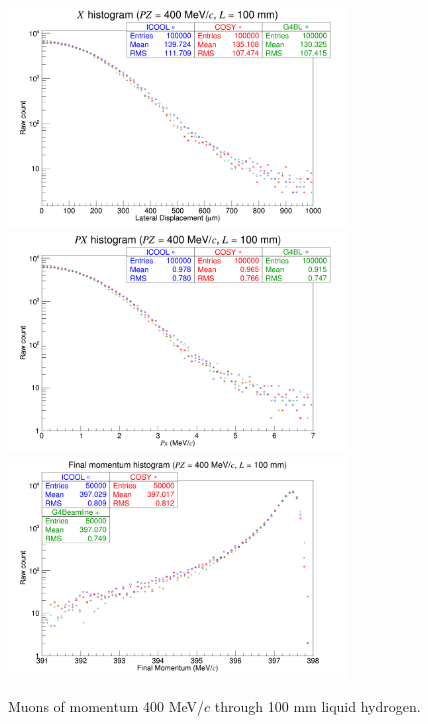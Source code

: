 \begin{figure}[!htb]
  \centering
    \includegraphics[width=0.8\textwidth]{Validation/LH/X.400.100.png} 
    \includegraphics[width=0.8\textwidth]{Validation/LH/PX.400.100.png} 
    \includegraphics[width=0.8\textwidth]{Validation/LH/strag.400.100.png} 
  \caption{Muons of momentum 400 MeV/$c$ through 100 mm liquid hydrogen.}
  \label{fig:400.100}
\end{figure}
 \label{apx:code}

